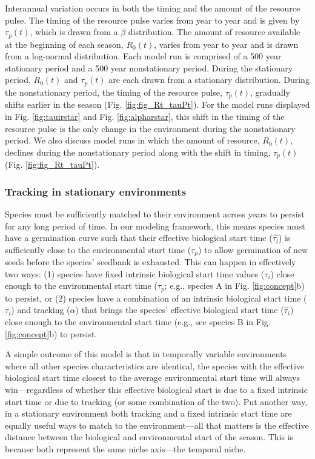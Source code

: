 \documentclass[11pt,letterpaper]{article}
\begin{document}
Interannual variation occurs in both the timing and the amount of the resource pulse.  The timing of the resource pulse varies from year to year and is given by $\tau_{p}(t)$, which is drawn from a $\beta$ distribution. The amount of resource available at the beginning of each season, $R_0(t)$, varies from year to year and is drawn from a log-normal distribution.  Each model run is comprised of a 500 year stationary period and a 500 year nonstationary period.  During the stationary period, $R_0(t)$ and $\tau_{p}(t)$ are each drawn from a stationary distribution.  During the nonstationary period, the timing of the resource pulse, $\tau_{p}(t)$, gradually shifts earlier in the season (Fig. \ref{fig:fig_Rt_tauPt}).  For the model runs displayed in Fig. \ref{fig:tauirstar} and Fig. \ref{fig:alpharstar}, this shift in the timing of the resource pulse is the only change in the environment during the nonstationary period.  We also discuss model runs in which the amount of resource, $R_0(t)$,  declines during the nonstationary period along with the shift in timing, $\tau_{p}(t)$ (Fig. \ref{fig:fig_Rt_tauPt}).  \\   

\subsubsection{Tracking in stationary environments}
Species must be sufficiently matched to their environment across years to persist for any long period of time. In our modeling framework, this means species must have a germination curve such that their effective biological start time ($\hat{\tau_{i}}$) is sufficiently close to the environmental start time ($\tau_{p}$) to allow germination of new seeds before the species' seedbank is exhausted. This can happen in effectively two ways: (1) species have fixed intrinsic biological start time values ($\tau_i$) close enough to the environmental start time ($\tau_p$; e.g., species A in Fig. \ref{fig:concept}b) to persist, or (2) species have a combination of an intrinsic biological start time ($\tau_i$) and tracking ($\alpha$) that brings the species' effective biological start time ($\hat{\tau_{i}}$) close enough to the environmental start time (e.g., see species B in Fig. \ref{fig:concept}b) to persist.  

A simple outcome of this model is that in temporally variable environments where all other species characteristics are identical, the species with the effective biological start time closest to the average environmental start time will always win---regardless of whether this effective biological start is due to a fixed intrinsic start time or due to tracking (or some combination of the two). Put another way, in a stationary environment both tracking and a fixed intrinsic start time are equally useful ways to match to the environment---all that matters is the effective distance between the biological and environmental start of the season. This is because both represent the same niche axis---the temporal niche. 
\end{document}
